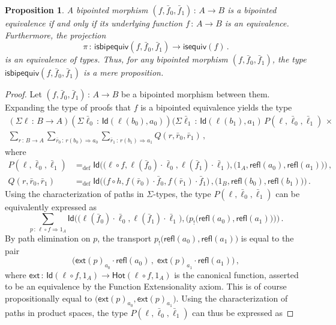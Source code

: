 \documentclass[10pt,a4paper,oneside,reqno]{amsart}
\theoremstyle{mythm}
\newtheorem{proposition}[theorem]{Proposition}
\theoremstyle{mydef}
\theoremstyle{myrmk}
\newcommand{\defeq}{=_{\mathrm{def}}}
\newcommand{\co}{\,{:}\,}
\newcommand{\com}{\circ}
\newcommand{\ct}{\cdot}
\newcommand{\isequiv}{\mathsf{isequiv}}
\newcommand{\Hot}{\mathsf{Hot}}
\newcommand{\ext}{\mathsf{ext}}
\newcommand{\Id}{\mathsf{Id}}
\newcommand{\refl}{\mathsf{refl}}
\newcommand{\isbipequiv}{\mathsf{isbipequiv}}
\begin{document}
\begin{proposition}  \label{thm:usemere}
A bipointed morphism $(f, \bar{f}_0, \bar{f}_1) \co A \to B$ is a bipointed equivalence if and only
if its underlying function $f \co A \to B$ is an equivalence. Furthermore, the projection
\[
\pi \co \isbipequiv(f, \bar{f}_0, \bar{f}_1)  \to \isequiv(f) \, .
\]
is an equivalence of types. Thus, for any bipointed morphism $(f, \bar{f}_0, \bar{f}_1)$, the type $\isbipequiv(f, \bar{f}_0, \bar{f}_1)$ is a mere proposition.
\end{proposition}  

\begin{proof}
Let  $(f, \bar{f}_0, \bar{f}_1) \co A \to B$ be a bipointed morphism between them. Expanding the type of 
proofs that $f$ is a bipointed equivalence yields the type
\begin{multline*} 
(\Sigma \ell \co B \to  A)
(\Sigma \bar{\ell}_0 \co \Id( \ell(b_0), a_0)) 
(\Sigma  \bar{\ell}_1 \co \Id( \ell(b_1), a_1) \, 
 P(\ell,\bar{\ell}_0,\bar{\ell}_1) \, \times \\
 \textstyle
 \sum_{r \co B \to A} 
 \sum_{\bar{r}_0 \co r(b_0) \Rightarrow a_0} 
 \sum_{\bar{r}_1 \co  r(b_1) \Rightarrow a_1} 
 Q(r,\bar{r}_0,\bar{r}_1)   \, ,
\end{multline*}
where
\begin{align*}
P(\ell,\bar{\ell}_0,\bar{\ell}_1) & \defeq \Id \Big( \big( \ell \com f, \ell(\bar{f}_0) \ct \bar{\ell}_0, \ell(\bar{f}_1) \ct \bar{\ell}_1\big), \big( 1_A, \refl(a_0), \refl(a_1) \big) \Big)  \, , \\
Q(r,\bar{r}_0,\bar{r}_1) & \defeq \Id \Big( \big( f \com h,   f(\bar{r}_0) \ct \bar{f}_0, f(\bar{r}_1) \ct \bar{f}_1  \big) \, , \big( 1_B, \refl(b_0), \refl(b_1) \big) \Big) \, .
\end{align*}
Using the characterization of paths in $\Sigma$-types, the type $P(\ell,\bar{\ell}_0,\bar{\ell}_1)$ can be equivalently expressed as
\[
\sum_{p \co \ell \com f \Rightarrow 1_A}  
\Id \Big(  \big( \ell (\bar{f}_0) \ct \bar{\ell }_0, \ell (\bar{f}_1) \ct \bar{\ell }_1\big), \big( p_{!}\big(\refl(a_0), \refl(a_1) \big) \big) \Big) \, .
\]
By path elimination on $p$, the transport $p_{!}\big(\refl(a_0), \refl(a_1) \big)$ is equal to the pair 
\[
\big(  \ext(p)_{a_0} \ct \refl(a_0) \, , \;  \ext(p)_{a_1} \ct \refl(a_1) \big) \, ,
\]
where $\ext \co \Id(\ell \com f, 1_A) \to \Hot(\ell \com f,  1_A)$ is the canonical function, asserted to be an equivalence by the Function Extensionality axiom. This is of course propositionally equal to $\big(\ext(p)_{a_0}, \ext(p)_{a_1} \big)$. Using the characterization of paths in product spaces, the type $P(\ell,\bar{\ell}_0,\bar{\ell}_1)$ can thus be expressed as

\end{proof}
\end{document}
